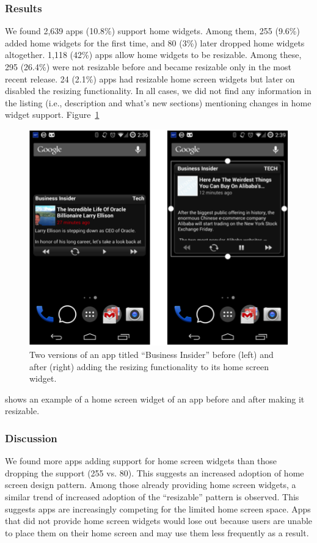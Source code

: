 \subsubsection{Results}

We found 2,639 apps (10.8\%) support home widgets.
Among them, 255 (9.6\%) added home widgets for the first time, and 80 (3\%) later dropped home widgets altogether. 
1,118 (42\%) apps allow home widgets to be resizable. 
Among these, 295 (26.4\%) were not resizable before and became resizable only in the most recent release. 
24 (2.1\%) apps had resizable home screen widgets but later on disabled the resizing functionality. 
In all cases, we did not find any information in the listing (i.e., description and what's new sections) mentioning changes in home widget support. Figure~\ref{fig:fig_resizble_widgets}
\begin{figure}[!t]
	\centering
	\includegraphics{figures/design-pattern-changes/resizble_widgets}
	\caption{Two versions of an app titled ``Business Insider'' before (left) and after (right) adding the resizing functionality to its home screen widget.}
	\label{fig:fig_resizble_widgets}
\end{figure}
shows an example of a home screen widget of an app before and after making it resizable.

\subsubsection{Discussion}

We found more apps adding support for home screen widgets than those dropping the support (255 vs. 80). 
This suggests an increased adoption of home screen design pattern. 
Among those already providing home screen widgets, a similar trend of increased adoption of the ``resizable'' pattern is observed. 
This suggests apps are increasingly competing for the limited home screen space. 
Apps that did not provide home screen widgets would lose out because users are unable to place them on their home screen and may use them less frequently as a result.

